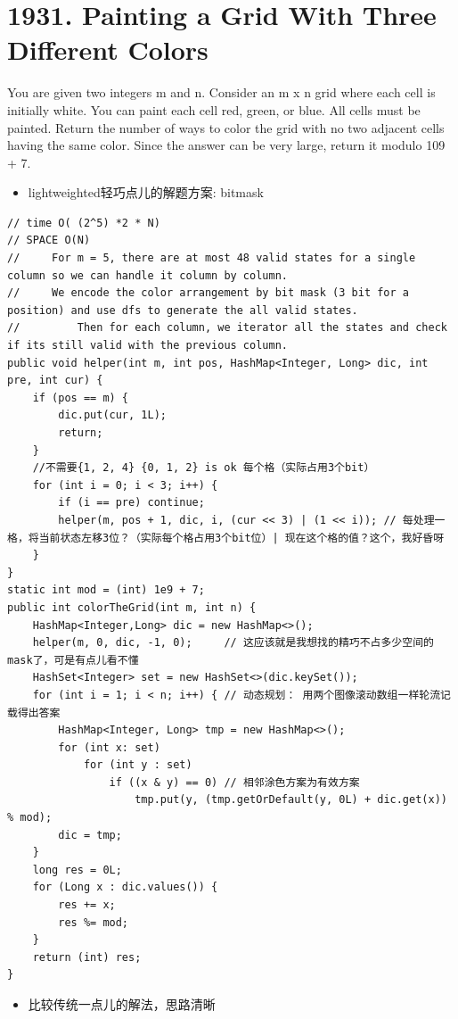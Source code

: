 \documentclass[9pt, b5paaper]{book}
\begin{document}
\section{1931. Painting a Grid With Three Different Colors}
\label{sec-2-16}
You are given two integers m and n. Consider an m x n grid where each cell is initially white. You can paint each cell red, green, or blue. All cells must be painted.
Return the number of ways to color the grid with no two adjacent cells having the same color. Since the answer can be very large, return it modulo 109 + 7.
\begin{itemize}
\item lightweighted轻巧点儿的解题方案: bitmask
\end{itemize}
\begin{verbatim}
// time O( (2^5) *2 * N)
// SPACE O(N)
//     For m = 5, there are at most 48 valid states for a single column so we can handle it column by column.
//     We encode the color arrangement by bit mask (3 bit for a position) and use dfs to generate the all valid states.
//         Then for each column, we iterator all the states and check if its still valid with the previous column.
public void helper(int m, int pos, HashMap<Integer, Long> dic, int pre, int cur) {
    if (pos == m) {
        dic.put(cur, 1L);
        return;
    }
    //不需要{1, 2, 4} {0, 1, 2} is ok 每个格（实际占用3个bit）
    for (int i = 0; i < 3; i++) {
        if (i == pre) continue; 
        helper(m, pos + 1, dic, i, (cur << 3) | (1 << i)); // 每处理一格，将当前状态左移3位？（实际每个格占用3个bit位）| 现在这个格的值？这个，我好昏呀
    }
}
static int mod = (int) 1e9 + 7;
public int colorTheGrid(int m, int n) {
    HashMap<Integer,Long> dic = new HashMap<>();
    helper(m, 0, dic, -1, 0);     // 这应该就是我想找的精巧不占多少空间的mask了，可是有点儿看不懂
    HashSet<Integer> set = new HashSet<>(dic.keySet());
    for (int i = 1; i < n; i++) { // 动态规划： 用两个图像滚动数组一样轮流记载得出答案
        HashMap<Integer, Long> tmp = new HashMap<>();
        for (int x: set) 
            for (int y : set) 
                if ((x & y) == 0) // 相邻涂色方案为有效方案
                    tmp.put(y, (tmp.getOrDefault(y, 0L) + dic.get(x)) % mod);
        dic = tmp;
    }
    long res = 0L;
    for (Long x : dic.values()) {
        res += x;
        res %= mod;
    }
    return (int) res;
}
\end{verbatim}
\begin{itemize}
\item 比较传统一点儿的解法，思路清晰
\end{itemize}
\end{document}
